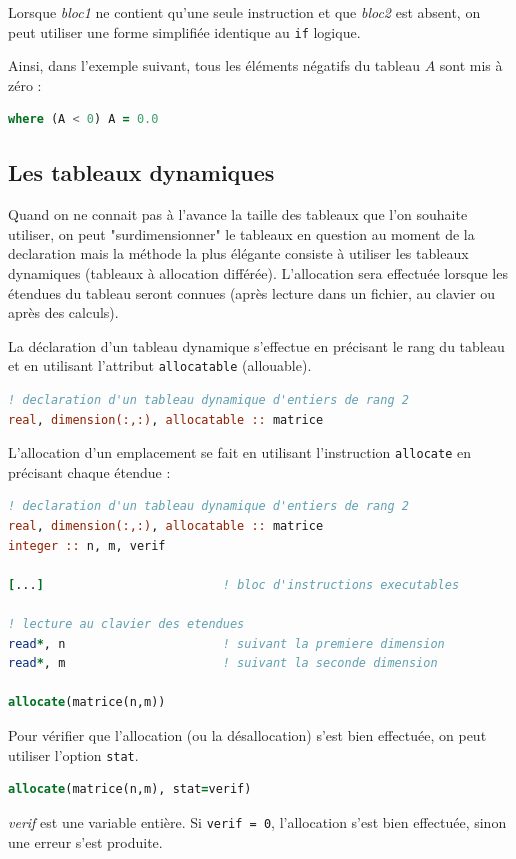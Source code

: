 \documentclass[a4paper,twoside]{article}
\begin{document}
Lorsque \emph{bloc1} ne contient qu'une seule instruction et que \emph{bloc2} est absent, on peut utiliser une forme simplifiée identique au \texttt{if} logique. 

Ainsi, dans l'exemple suivant, tous les éléments négatifs du tableau $A$ sont mis à zéro : 
\begin{lstlisting}[language=Fortran]
where (A < 0) A = 0.0
\end{lstlisting}

\subsection{Les tableaux dynamiques}

Quand on ne connait pas à l'avance la taille des tableaux que l'on souhaite utiliser, on peut "surdimensionner" le tableaux en question au moment de la declaration mais la méthode la plus élégante consiste à utiliser les tableaux dynamiques (tableaux à allocation différée). L'allocation sera effectuée lorsque les étendues du tableau seront connues (après lecture dans un fichier, au clavier ou après des calculs).

\bigskip

La déclaration d'un tableau dynamique s'effectue en précisant le 
rang du tableau et en utilisant l'attribut \texttt{allocatable} 
(allouable). 
\begin{lstlisting}[language=Fortran]
! declaration d'un tableau dynamique d'entiers de rang 2 
real, dimension(:,:), allocatable :: matrice
\end{lstlisting}

\bigskip

L'allocation d'un emplacement se fait en utilisant l'instruction \texttt{allocate} en précisant chaque étendue :
\begin{lstlisting}[language=Fortran]
! declaration d'un tableau dynamique d'entiers de rang 2 
real, dimension(:,:), allocatable :: matrice
integer :: n, m, verif

[...]                         ! bloc d'instructions executables

! lecture au clavier des etendues
read*, n                      ! suivant la premiere dimension
read*, m                      ! suivant la seconde dimension

allocate(matrice(n,m))
\end{lstlisting}

\begin{remarque}
Pour vérifier que l'allocation (ou la désallocation) s'est bien effectuée, on peut utiliser l'option \texttt{stat}. 
\begin{lstlisting}[language=Fortran]
allocate(matrice(n,m), stat=verif)
\end{lstlisting}
\emph{verif} est une variable entière. Si \texttt{verif = 0}, l'allocation s'est bien effectuée, sinon une erreur s'est produite. 
\end{remarque}
\end{document}
